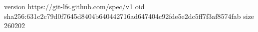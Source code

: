 version https://git-lfs.github.com/spec/v1
oid sha256:631c2c79d0f7645d8404b640442716ad647404c92fde5e2dc5ff7f3af8574fab
size 260202
